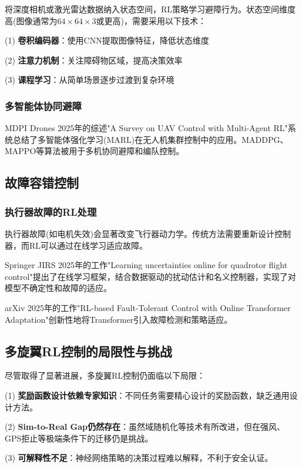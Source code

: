 \documentclass[12pt,a4paper]{ctexart}
\begin{document}
将深度相机或激光雷达数据纳入状态空间，RL策略学习避障行为。状态空间维度高(图像通常为$64\times64\times3$或更高)，需要采用以下技术：

(1) \textbf{卷积编码器}：使用CNN提取图像特征，降低状态维度

(2) \textbf{注意力机制}：关注障碍物区域，提高决策效率

(3) \textbf{课程学习}：从简单场景逐步过渡到复杂环境

\subsubsection{多智能体协同避障}

MDPI Drones 2025年的综述"A Survey on UAV Control with Multi-Agent RL"系统总结了多智能体强化学习(MARL)在无人机集群控制中的应用。MADDPG、MAPPO等算法被用于多机协同避障和编队控制。

\subsection{故障容错控制}

\subsubsection{执行器故障的RL处理}

执行器故障(如电机失效)会显著改变飞行器动力学。传统方法需要重新设计控制器，而RL可以通过在线学习适应故障。

Springer JIRS 2025年的工作"Learning uncertainties online for quadrotor flight control"提出了在线学习框架，结合数据驱动的扰动估计和名义控制器，实现了对模型不确定性和故障的适应。

arXiv 2025年的工作"RL-based Fault-Tolerant Control with Online Transformer Adaptation"创新性地将Transformer引入故障检测和策略适应。

\subsection{多旋翼RL控制的局限性与挑战}

尽管取得了显著进展，多旋翼RL控制仍面临以下局限：

(1) \textbf{奖励函数设计依赖专家知识}：不同任务需要精心设计的奖励函数，缺乏通用设计方法。

(2) \textbf{Sim-to-Real Gap仍然存在}：虽然域随机化等技术有所改进，但在强风、GPS拒止等极端条件下的迁移仍是挑战。

(3) \textbf{可解释性不足}：神经网络策略的决策过程难以解释，不利于安全认证。
\end{document}
